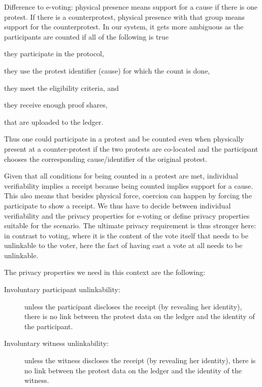 Difference to e-voting:
physical presence means support for a cause if there is one protest. If there is a counterprotest, physical presence with that group means support for the counterprotest. In our system, it gets more ambiguous as the participants are counted if all of the following is true
\begin{enumerate*}
\item they participate in the protocol,
\item they use the protest identifier (cause) for which the count is done,
\item they meet the eligibility criteria, and
\item they receive enough proof shares,
\item that are uploaded to the ledger.
\end{enumerate*}
Thus one could participate in a protest and be counted even when physically 
present at a counter-protest if the two protests are co-located and the 
participant chooses the corresponding cause/identifier of the original protest.

Given that all conditions for being counted in a protest are met, individual 
verifiability implies a receipt  because being counted implies support for a cause. 
This also means that besides physical force, coercion can happen by forcing the 
participate to show a receipt. 
We thus have to decide between individual verifiability and the privacy 
properties for e-voting or define privacy properties suitable for the scenario. 
The ultimate privacy requirement is thus stronger here: in contrast to voting, 
where it is the content of the vote itself that needs to be unlinkable to the 
voter, here the fact of having cast a vote at all needs to be unlinkable.

The privacy properties we need in this context are the following:
\begin{description}
 \item[Involuntary participant unlinkability:]  unless the participant discloses the receipt 
   (by revealing her identity), there is no link between the protest data on 
   the ledger and the identity of the participant.

 \item[Involuntary witness unlinkability:]  unless the witness discloses the receipt (by revealing her 
   identity), there is no link between the protest data on the ledger and the 
   identity of the witness.
\end{description}

